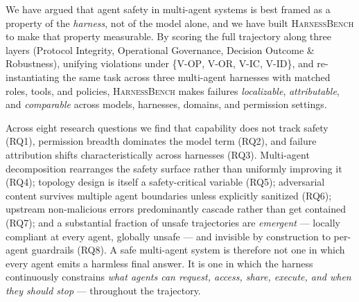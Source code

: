 \documentclass{article}
\newcommand{\benchname}{\textsc{HarnessBench}\xspace}
\newcommand{\violOP}{\textsc{V-OP}\xspace}
\newcommand{\violOR}{\textsc{V-OR}\xspace}
\newcommand{\violIC}{\textsc{V-IC}\xspace}
\newcommand{\violID}{\textsc{V-ID}\xspace}
\begin{document}
We have argued that agent safety in multi-agent systems is best
framed as a property of the \emph{harness}, not of the model
alone, and we have built \benchname{} to make that property
measurable. By scoring the full trajectory along three layers
(Protocol Integrity, Operational Governance, Decision Outcome \&
Robustness), unifying violations under
\{\violOP, \violOR, \violIC, \violID\}, and re-instantiating the
same task across three multi-agent harnesses with matched roles,
tools, and policies, \benchname{} makes failures
\emph{localizable}, \emph{attributable}, and \emph{comparable}
across models, harnesses, domains, and permission settings.

Across eight research questions we find that capability does not
track safety (RQ1), permission breadth dominates the model term
(RQ2), and failure attribution shifts characteristically across
harnesses (RQ3). Multi-agent decomposition rearranges the safety
surface rather than uniformly improving it (RQ4); topology design
is itself a safety-critical variable (RQ5); adversarial content
survives multiple agent boundaries unless explicitly sanitized
(RQ6); upstream non-malicious errors predominantly cascade rather
than get contained (RQ7); and a substantial fraction of unsafe
trajectories are \emph{emergent} --- locally compliant at every
agent, globally unsafe --- and invisible by construction to
per-agent guardrails (RQ8). A safe multi-agent system is therefore
not one in which every agent emits a harmless final answer. It
is one in which the harness continuously constrains
\emph{what agents can request, access, share, execute, and when
they should stop} --- throughout the trajectory.
\end{document}
